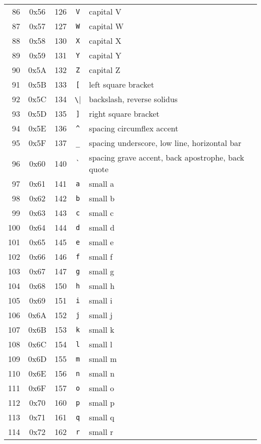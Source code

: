 \begin{supertabular}{r|c|c|c|p{.3\linewidth}}
86 & 0x56 & 126 & \verb|V| & capital V                    \\
87 & 0x57 & 127 & \verb|W| & capital W                    \\
88 & 0x58 & 130 & \verb|X| & capital X                    \\
89 & 0x59 & 131 & \verb|Y| & capital Y                    \\
90 & 0x5A & 132 & \verb|Z| & capital Z                    \\
91 & 0x5B & 133 & \verb|[| & left square bracket          \\
92 & 0x5C & 134 & \verb|\| & backslash, reverse solidus   \\
93 & 0x5D & 135 & \verb|]| & right square bracket         \\
94 & 0x5E & 136 & \verb|^| & spacing circumflex accent     \\
95 & 0x5F & 137 & \verb|_| & spacing underscore, low line, horizontal bar\\
96 & 0x60 & 140 & \verb|`| &   spacing grave accent, back apostrophe, back quote\\
97 & 0x61 & 141 & \verb|a| & small a \\
98 & 0x62 & 142 & \verb|b| & small b \\
99 & 0x63 & 143 & \verb|c| & small c \\
100 & 0x64 & 144 & \verb|d| &small d  \\
101 & 0x65 & 145 & \verb|e| &small e  \\
102 & 0x66 & 146 & \verb|f| &small f  \\
103 & 0x67 & 147 & \verb|g| &small g  \\
104 & 0x68 & 150 & \verb|h| &small h  \\
105 & 0x69 & 151 & \verb|i| &small i  \\
106 & 0x6A & 152 & \verb|j| &small j  \\
107 & 0x6B & 153 & \verb|k| &small k  \\
108 & 0x6C & 154 & \verb|l| &small l  \\
109 & 0x6D & 155 & \verb|m| &small m  \\
110 & 0x6E & 156 & \verb|n| &small n  \\
111 & 0x6F & 157 & \verb|o| &small o  \\
112 & 0x70 & 160 & \verb|p| &small p  \\
113 & 0x71 & 161 & \verb|q| &small q  \\
114 & 0x72 & 162 & \verb|r| &small r  \\

\end{supertabular}
